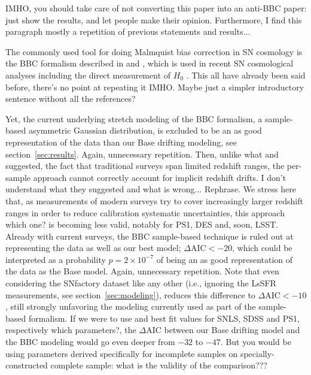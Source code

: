 \documentclass[]{aa} %
\newcommand{\mr}[1]{{\textcolor[rgb]{0.60,0.10,0.6}{#1}}}
\newcommand{\yc}[1]{{\textcolor{BrickRed}{#1}}}
\begin{document}
\yc{IMHO, you should take care of not converting this paper into an anti-BBC paper: just show the results, and let people make their opinion. Furthermore, I find this paragraph mostly a repetition of previous statements and results...}

The commonly used tool for doing Malmquist bias correction in SN cosmology is
the BBC formalism described in \cite{scolnic2016} and \cite{kessler2017}, which
is used in recent SN cosmological analyses \citep{jones2018b, scolnic2018a,
brout2019, descosmopaper2019} including the direct measurement of $H_0$
\citep{riess2016,riess2019}. \yc{This all have already been said before, there's no point at repeating it IMHO. Maybe just a simpler introductory sentence without all the references?}

\mr{Yet, the current underlying stretch modeling of the BBC formalism, a sample-based asymmetric Gaussian distribution, is excluded to be an as good representation of the data than our Base drifting modeling, see section~\ref{sec:results}. \yc{Again, unnecessary repetition.} Then, unlike what  \citet[][section~2]{scolnic2016} and
\citet[][section~5.4]{scolnic2018a} suggested, the fact that traditional surveys span limited redshift ranges, the per-sample approach cannot correctly account for implicit redshift drifts.} \yc{I don't understand what they suggested and what is wrong... Rephrase.} We stress here that, as measurements of
modern surveys \yc{try to} cover increasingly larger redshift ranges \yc{in order} to reduce calibration
systematic uncertainties, this approach \yc{which one?} is becoming less valid, notably for PS1,
DES and, soon, LSST. Already with current surveys, the BBC sample-based
technique is ruled out at representing the data as well as our best model;
$\Delta\mathrm{AIC}<-20$, which could be interpreted as a probability $p=2\times
10^{-7}$ of being an as good representation of the data as the Base model. \yc{Again, unnecessary repetition.} Note
that even considering the SNfactory dataset like any other (i.e., ignoring the
LsSFR measurements, see section~\ref{sec:modeling}), reduces this difference to
$\Delta\mathrm{AIC}<-10$, still strongly unfavoring the modeling currently used
as part of the \mr{sample-based formalism}.
If we were to use \cite{scolnic2016} and
\cite{scolnic2018a} best fit values for SNLS, SDSS and PS1, respectively \yc{which parameters?}, the
$\Delta\mathrm{AIC}$ between our Base drifting model and the BBC modeling would
go even deeper from $-32$ to $-47$.  \yc{But you would be using parameters derived specifically for incomplete samples on specially-constructed complete sample: what is the validity of the comparison???}
\end{document}

